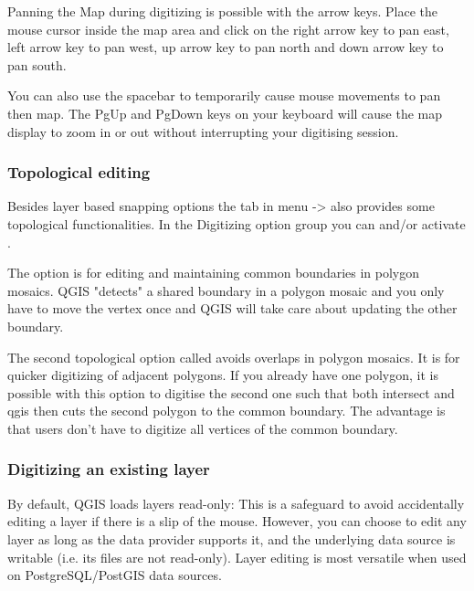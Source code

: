
Panning the Map during digitizing is possible with the arrow keys. Place
the mouse cursor inside the map area and click on the right arrow key to
pan east, left arrow key to pan west, up arrow key to pan north and down
arrow key to pan south.

You can also use the spacebar to temporarily cause mouse movements to pan
then map. The PgUp and PgDown keys on your keyboard will cause the map
display to zoom in or out without interrupting your digitising session.

\subsubsection{Topological editing}

Besides layer based snapping options the  tab in menu 
 ->  
also provides some topological functionalities. 
In the Digitizing option group you can  and/or activate 
.


The option  is for editing and maintaining 
common boundaries in polygon mosaics. QGIS "detects" a shared boundary in 
a polygon mosaic and you only have to move the vertex once and QGIS will take 
care about updating the other boundary.


The second topological option called  
avoids overlaps in polygon mosaics. It is for quicker digitizing of adjacent polygons. 
If you already have one polygon, it is possible with this option to digitise the second 
one such that both intersect and qgis then cuts the second polygon to the common boundary. 
The advantage is that users don't have to digitize all vertices of the common boundary.

\subsubsection{Digitizing an existing layer}
\label{sec:edit_existing_layer}

By default, QGIS loads layers read-only: This is a safeguard
to avoid accidentally editing a layer if there is a slip of the mouse.
However, you can choose to edit any layer as long as the data provider
supports it, and the underlying data source is writable (i.e. its files are
not read-only). Layer editing is most versatile when used on
PostgreSQL/PostGIS data sources.

